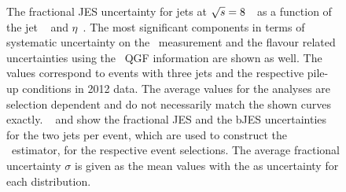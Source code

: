 \begin{figure}[tbp!]
{	\label{sfig:selectionJES}
}
\caption[\gls{JES} uncertainties for $\sqrts=8$~\TeV\ data]{
%
The fractional \gls{JES} uncertainty for jets at $\sqrts=8$~\TeV\ as a function of the jet \pt~ and $\eta$~. 
%
The most significant components in terms of systematic uncertainty on the \mt\ measurement and the flavour related uncertainties using the \dil\ \gls{QGF} information are shown as well.
%
The values correspond to events with three jets and the respective pile-up conditions in 2012 data. The average values for the analyses are selection dependent and do not necessarily match the shown curves exactly.
%
~ and  show the fractional \gls{JES} and the \gls{bJES} uncertainties for the two jets per event, which are used to construct the \mlbr\ estimator, for the respective event selections. The average fractional uncertainty $\sigma$ is given as the mean values with the  as uncertainty for each distribution.
%
\label{fig:JES8TeV}
}
\end{figure}
%
